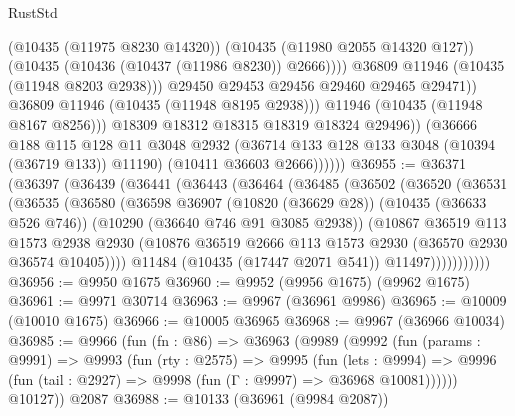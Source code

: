 \begin{lexlean}{RustStd}
\begin{coremodule}
                              (@10435 (@11975 @8230 @14320))
                              (@10435 (@11980 @2055 @14320 @127))
                              (@10435 (@10436 (@10437 (@11986 @8230)) @2666))))
                          @36809
                          @11946
                          (@10435 (@11948 @8203 @2938)))
                        @29450
                        @29453
                        @29456
                        @29460
                        @29465
                        @29471))
                    @36809
                    @11946
                    (@10435 (@11948 @8195 @2938)))
                  @11946
                  (@10435 (@11948 @8167 @8256)))
                @18309
                @18312
                @18315
                @18319
                @18324
                @29496))
            (@36666
              @188
              @115
              @128
              @11
              @3048
              @2932
              (@36714 @133 @128 @133 @3048 (@10394 (@36719 @133)) @11190)
              (@10411 @36603 @2666))))))
@36955 := @36371
    (@36397
      (@36439
        (@36441
          (@36443
            (@36464
              (@36485
                (@36502
                  (@36520
                    (@36531
                      (@36535
                        (@36580
                          (@36598
                            @36907
                            (@10820 (@36629 @28))
                            (@10435 (@36633 @526 @746))
                            (@10290 (@36640 @746 @91 @3085 @2938))
                            (@10867
                              @36519
                              @113
                              @1573
                              @2938
                              @2930
                              (@10876 @36519 @2666 @113 @1573 @2930 (@36570 @2930 @36574 @10405))))
                          @11484
                          (@10435 (@17447 @2071 @541))
                          @11497)))))))))))
@36956 := @9950 @1675
@36960 := @9952 (@9956 @1675) (@9962 @1675)
@36961 := @9971 @30714
@36963 := @9967 (@36961 @9986)
@36965 := @10009 (@10010 @1675)
@36966 := @10005 @36965
@36968 := @9967 (@36966 @10034)
@36985 := @9966
    (fun (fn : @86) =>
    @36963
      (@9989
        (@9992
          (fun (params : @9991) =>
          @9993
            (fun (rty : @2575) =>
            @9995
              (fun (lets : @9994) =>
              @9996 (fun (tail : @2927) => @9998 (fun (Γ : @9997) => @36968 @10081))))))
        @10127))
    @2087
@36988 := @10133 (@36961 (@9984 @2087))

\end{coremodule}
\end{lexlean}
